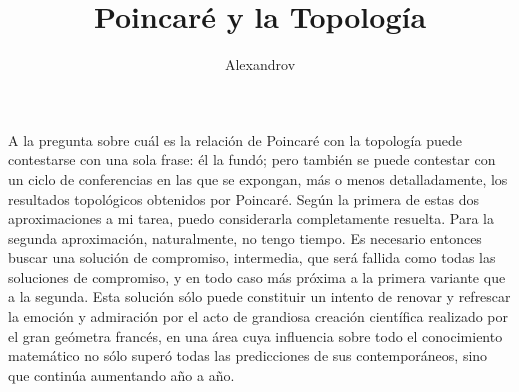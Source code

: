 \documentclass[a4paper, 12pt]{article}
\title{Poincaré y la Topología}
\author{Alexandrov}
\date{}
\begin{document}
\begin{tcolorbox}[colback=blue!5!white,colframe=blue!75!black]

\vspace{-1.8cm}
\textbf \maketitle

\end{tcolorbox}

\bigskip


A la pregunta sobre cuál es la relación de Poincaré con la topología puede contestarse con una sola frase: él la fundó; pero también se puede contestar con un ciclo de conferencias en las que se expongan, más o menos detalladamente, los resultados topológicos obtenidos por Poincaré. Según la primera de estas dos aproximaciones a mi tarea, puedo considerarla completamente resuelta. Para la segunda aproximación, naturalmente, no tengo tiempo. Es necesario entonces buscar  una solución de compromiso, intermedia, que será fallida como todas las soluciones de compromiso, y en todo caso más próxima a la primera variante que a la segunda. Esta solución sólo puede constituir un intento de renovar y refrescar la emoción y admiración por el acto de grandiosa creación científica realizado por el 
gran geómetra francés, en una área cuya influencia sobre todo el conocimiento matemático no sólo superó todas las predicciones de sus contemporáneos, sino que 
continúa aumentando año a año.
\end{document}
